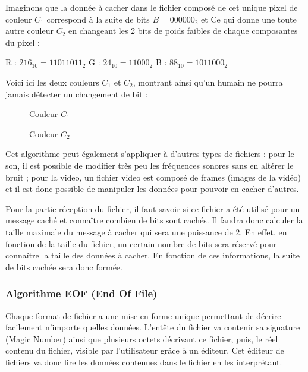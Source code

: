 \documentclass[11pt]{article}
\begin{document}
Imaginons que la donnée à cacher dans le fichier composé de cet unique pixel de couleur $C_1$ correspond à la suite de bits $B = 000000_2$ et
Ce qui donne une toute autre couleur $C_2$ en changeant les 2 bits de poids faibles de chaque composantes du pixel : 

R : $216_{10} = 11011011_2$ \qquad G : $24_{10} = 11000_2$ \qquad B : $88_{10} = 1011000_2$


Voici ici les deux couleurs $C_1$ et $C_2$, montrant ainsi qu'un humain ne pourra jamais détecter un changement de bit : 

\begin{figure}[h]
 \begin{minipage}{.46\linewidth}
  \centering{}
  \caption{Couleur $C_1$}
 \end{minipage} \hfill
 \begin{minipage}{.46\linewidth}
  \centering{}
  \caption{Couleur $C_2$}
 \end{minipage}
\end{figure}

Cet algorithme peut également s'appliquer à d'autres types de fichiers : pour le son, il est possible de modifier très peu les fréquences sonores sans en altérer le bruit ; 
pour la video, un fichier video est composé de frames (images de la vidéo) et il est donc possible de manipuler les données pour pouvoir en cacher d'autres. 

Pour la partie réception du fichier, il faut savoir si ce fichier a été utilisé pour un message caché et connaître combien de bits sont cachés. 
Il faudra donc calculer la taille maximale du message à cacher qui sera une puissance de 2. En effet, en fonction de la taille du fichier, un certain nombre de bits sera réservé pour connaître la taille 
des données à cacher. 
En fonction de ces informations, la suite de bits cachée sera donc formée.

\subsubsection{Algorithme EOF (End Of File)}
Chaque format de fichier a une mise en forme unique permettant de décrire facilement n'importe quelles données. 
L'entête du fichier va contenir sa signature (Magic Number) ainsi que plusieurs octets décrivant ce fichier, puis, le réel contenu du fichier, visible par l'utilisateur grâce à un éditeur. 
Cet éditeur de fichiers va donc lire les données contenues dans le fichier en les interprétant. 
\end{document}
